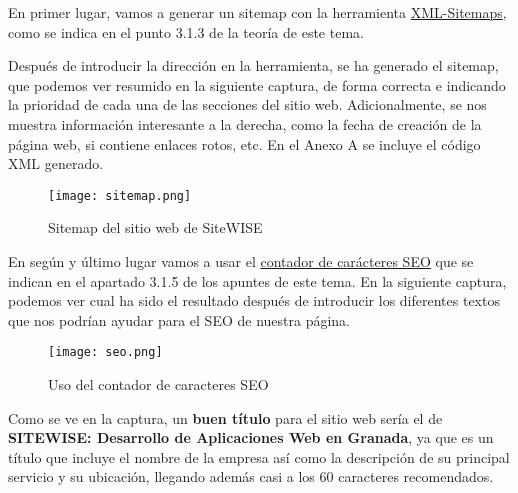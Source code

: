 En primer lugar, vamos a generar un sitemap con la herramienta \href{https://www.xml-sitemaps.com/}{XML-Sitemaps}, como se indica en el punto 3.1.3 de la teoría de este tema.

Después de introducir la dirección en la herramienta, se ha generado el sitemap, que podemos ver resumido en la siguiente captura, de forma correcta e indicando la prioridad de cada una de las secciones del sitio web. Adicionalmente, se nos muestra información interesante a la derecha, como la fecha de creación de la página web, si contiene enlaces rotos, etc. En el Anexo A se incluye el código XML generado.


\begin{figure}[H]
    \centering
    \texttt{[image: sitemap.png]}
    \caption{Sitemap del sitio web de SiteWISE}
\end{figure}

En según y último lugar vamos a usar el \href{https://www.contadordecaracteres.com/contador-de-caracteres-para-seo.html}{contador de carácteres SEO} que se indican en el apartado 3.1.5 de los apuntes de este tema. En la siguiente captura, podemos ver cual ha sido el resultado después de introducir los diferentes textos que nos podrían ayudar para el SEO de nuestra página.

\begin{figure}[H]
    \centering
    \texttt{[image: seo.png]}
    \caption{Uso del contador de caracteres SEO}
\end{figure}

Como se ve en la captura, un \textbf{buen título} para el sitio web sería el de \textbf{SITEWISE: Desarrollo de Aplicaciones Web en Granada}, ya que es un título que incluye el nombre de la empresa así como la descripción de su principal servicio y su ubicación, llegando además casi a los 60 caracteres recomendados.

\appendix

